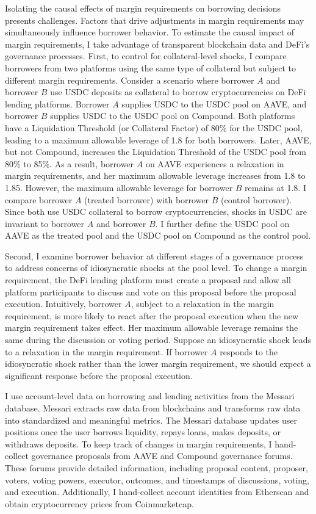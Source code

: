 \documentclass[12pt]{article}
\begin{document}
 
 Isolating the causal effects of margin requirements on borrowing decisions presents challenges. Factors that drive adjustments in margin requirements may simultaneously influence borrower behavior. To estimate the causal impact of margin requirements, I take advantage of transparent blockchain data and DeFi's governance processes. First, to control for collateral-level shocks, I compare borrowers from two platforms using the same type of collateral but subject to different margin requirements. Consider a scenario where borrower $A$ and borrower $B$ use USDC deposits as collateral to borrow cryptocurrencies on DeFi lending platforms. Borrower $A$ supplies USDC to the USDC pool on AAVE, and borrower $B$ supplies USDC to the USDC pool on Compound. Both platforms have a Liquidation Threshold (or Collateral Factor) of 80\% for the USDC pool, leading to a maximum allowable leverage of 1.8 for both borrowers. Later, AAVE, but not Compound, increases the Liquidation Threshold of the USDC pool from 80\% to 85\%. As a result, borrower $A$ on AAVE experiences a relaxation in margin requirements, and her maximum allowable leverage increases from 1.8 to 1.85. However, the maximum allowable leverage for borrower $B$ remains at 1.8. I compare borrower $A$ (treated borrower) with borrower $B$ (control borrower). Since both use USDC collateral to borrow cryptocurrencies,  shocks in USDC are invariant to borrower $A$ and borrower $B$. I further define the USDC pool on AAVE as the treated pool and the USDC pool on Compound as the control pool. 

Second, I examine borrower behavior at different stages of a governance process to address concerns of idiosyncratic shocks at the pool level. To change a margin requirement, the DeFi lending platform must create a proposal and allow all platform participants to discuss and vote on this proposal before the proposal execution. Intuitively, borrower $A$, subject to a relaxation in the margin requirement, is more likely to react after the proposal execution when the new margin requirement takes effect. Her maximum allowable leverage remains the same during the discussion or voting period. Suppose an idiosyncratic shock leads to a relaxation in the margin requirement. If borrower $A$ responds to the idiosyncratic shock rather than the lower margin requirement, we should expect a significant response before the proposal execution.

I use account-level data on borrowing and lending activities from the Messari database. Messari extracts raw data from blockchains and transforms raw data into standardized and meaningful metrics. The Messari database updates user positions once the user borrows liquidity, repays loans, makes deposits, or withdraws deposits. To keep track of changes in margin requirements, I hand-collect governance proposals from AAVE and Compound governance forums. These forums provide detailed information, including proposal content, proposer, voters, voting powers, executor, outcomes, and timestamps of discussions, voting, and execution. Additionally, I hand-collect account identities from Etherscan and obtain cryptocurrency prices from Coinmarketcap.
\end{document}
